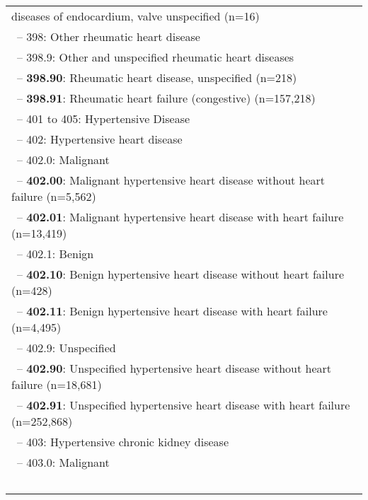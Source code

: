 \begin{longtable}{p{\textwidth}}
diseases of endocardium, valve unspecified (n=16)} \\ \-\ \hspace{20pt}\footnotesize{-- 398: Other rheumatic heart disease} \\ \-\ \hspace{30pt}\footnotesize{-- 398.9: Other and unspecified rheumatic heart diseases} \\ \-\ \hspace{40pt}\footnotesize{-- {\color{ForestGreen} \textbf{398.90}}: Rheumatic heart disease, unspecified (n=218)} \\ \-\ \hspace{40pt}\footnotesize{-- {\color{ForestGreen} \textbf{398.91}}: Rheumatic heart failure (congestive) (n=157,218)} \\ \-\ \hspace{10pt}\footnotesize{-- 401 to 405: Hypertensive Disease} \\ \-\ \hspace{20pt}\footnotesize{-- 402: Hypertensive heart disease} \\ \-\ \hspace{30pt}\footnotesize{-- 402.0: Malignant} \\ \-\ \hspace{40pt}\footnotesize{-- {\color{ForestGreen} \textbf{402.00}}: Malignant hypertensive heart disease without heart failure (n=5,562)} \\ \-\ \hspace{40pt}\footnotesize{-- {\color{ForestGreen} \textbf{402.01}}: Malignant hypertensive heart disease with heart failure (n=13,419)} \\ \-\ \hspace{30pt}\footnotesize{-- 402.1: Benign} \\ \-\ \hspace{40pt}\footnotesize{-- {\color{ForestGreen} \textbf{402.10}}: Benign hypertensive heart disease without heart failure (n=428)} \\ \-\ \hspace{40pt}\footnotesize{-- {\color{ForestGreen} \textbf{402.11}}: Benign hypertensive heart disease with heart failure (n=4,495)} \\ \-\ \hspace{30pt}\footnotesize{-- 402.9: Unspecified} \\ \-\ \hspace{40pt}\footnotesize{-- {\color{ForestGreen} \textbf{402.90}}: Unspecified hypertensive heart disease without heart failure (n=18,681)} \\ \-\ \hspace{40pt}\footnotesize{-- {\color{ForestGreen} \textbf{402.91}}: Unspecified hypertensive heart disease with heart failure (n=252,868)} \\ \-\ \hspace{20pt}\footnotesize{-- 403: Hypertensive chronic kidney disease} \\ \-\ \hspace{30pt}\footnotesize{-- 403.0: Malignant} \\ \-\ \hspace{40pt}\footnotesize{-- {\color{ForestGreen} 
\end{longtable}
